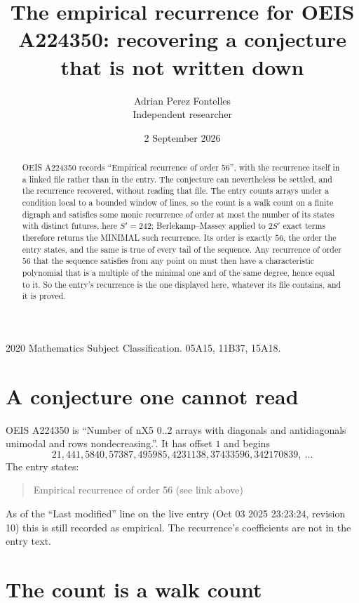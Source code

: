 \documentclass[11pt,a4paper]{article}
\title{The empirical recurrence for OEIS A224350: recovering a conjecture that is not written down}
\author{Adrian Perez Fontelles\\ \small Independent researcher}
\date{2 September 2026}
\theoremstyle{plain}
\theoremstyle{definition}
\begin{document}
\maketitle

\begin{abstract}
OEIS A224350 records ``Empirical recurrence of order $56$'', with the recurrence itself in a
linked file rather than in the entry. The conjecture can nevertheless be settled, and the
recurrence recovered, without reading that file. The entry counts arrays under a condition
local to a bounded window of lines, so the count is a walk count on a finite digraph and
satisfies some monic recurrence of order at most the number of its states with distinct
futures, here $S'=242$; Berlekamp--Massey applied to $2S'$ exact
terms therefore returns the MINIMAL such recurrence. Its order is exactly $56$, the order
the entry states, and the same is true of every tail of the sequence. Any recurrence of order
$56$ that the sequence satisfies from any point on must then have a characteristic
polynomial that is a multiple of the minimal one and of the same degree, hence equal to it. So
the entry's recurrence is the one displayed here, whatever its file contains, and it is
proved.
\end{abstract}

\noindent\small 2020 Mathematics Subject Classification. 05A15, 11B37, 15A18.\normalsize

\section{A conjecture one cannot read}

OEIS A224350 is ``Number of nX5 0..2 arrays with diagonals and antidiagonals unimodal and rows nondecreasing.''. It has offset $1$ and begins
\[
21, 441, 5840, 57387, 495985, 4231138, 37433596, 342170839,\ \dots
\]
The entry states:
\begin{quote}
Empirical recurrence of order 56 (see link above)
\end{quote}
As of the ``Last modified'' line on the live entry (Oct 03 2025 23:23:24, revision 10) this is still
recorded as empirical. The recurrence's coefficients are not in the entry text.

\section{The count is a walk count}
\end{document}
